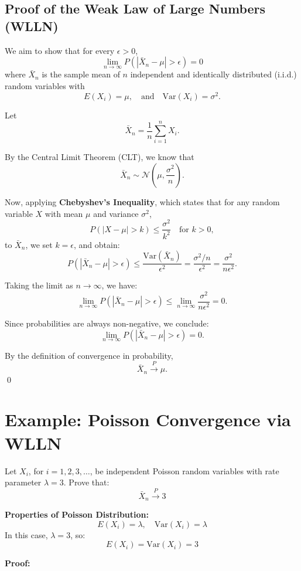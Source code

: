 \subsection*{Proof of the Weak Law of Large Numbers (WLLN)}

We aim to show that for every \( \epsilon > 0 \),
\[
\lim_{n \to \infty} P\left( \left| \bar{X}_n - \mu \right| > \epsilon \right) = 0
\]
where \( \bar{X}_n \) is the sample mean of \( n \) independent and identically distributed (i.i.d.) random variables with
\[
E(X_i) = \mu, \quad \text{and} \quad \mathrm{Var}(X_i) = \sigma^2.
\]

Let
\[
\bar{X}_n = \frac{1}{n} \sum_{i=1}^{n} X_i.
\]

By the Central Limit Theorem (CLT), we know that
\[
\bar{X}_n \sim \mathcal{N} \left( \mu, \frac{\sigma^2}{n} \right).
\]

Now, applying \textbf{Chebyshev’s Inequality}, which states that for any random variable \( X \) with mean \( \mu \) and variance \( \sigma^2 \),
\[
P\left( |X - \mu| > k \right) \leq \frac{\sigma^2}{k^2} \quad \text{for } k > 0,
\]
to \( \bar{X}_n \), we set \( k = \epsilon \), and obtain:
\[
P\left( \left| \bar{X}_n - \mu \right| > \epsilon \right) \leq \frac{\mathrm{Var}(\bar{X}_n)}{\epsilon^2} = \frac{\sigma^2 / n}{\epsilon^2} = \frac{\sigma^2}{n \epsilon^2}.
\]

Taking the limit as \( n \to \infty \), we have:
\[
\lim_{n \to \infty} P\left( \left| \bar{X}_n - \mu \right| > \epsilon \right) \leq \lim_{n \to \infty} \frac{\sigma^2}{n \epsilon^2} = 0.
\]

Since probabilities are always non-negative, we conclude:
\[
\lim_{n \to \infty} P\left( \left| \bar{X}_n - \mu \right| > \epsilon \right) = 0.
\]

By the definition of convergence in probability,
\[
\bar{X}_n \xrightarrow{P} \mu.
\]
\qed
\section*{Example: Poisson Convergence via WLLN}

Let \( X_i \), for \( i = 1, 2, 3, \ldots \), be independent Poisson random variables with rate parameter \( \lambda = 3 \). Prove that:
\[
\bar{X}_n \xrightarrow{P} 3
\]

\textbf{Properties of Poisson Distribution:}
\[
E(X_i) = \lambda, \quad \mathrm{Var}(X_i) = \lambda
\]
In this case, \( \lambda = 3 \), so:
\[
E(X_i) = \mathrm{Var}(X_i) = 3
\]

\textbf{Proof:}

